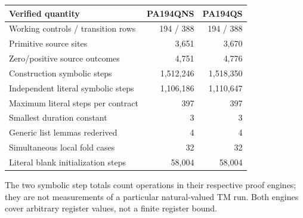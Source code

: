 \begin{center}\small
\begin{tabular}{lrr}
\toprule Verified quantity & PA194QNS & PA194QS\\\midrule
Working controls / transition rows & 194 / 388 & 194 / 388\\
Primitive source sites & 3,651 & 3,670\\
Zero/positive source outcomes & 4,751 & 4,776\\
Construction symbolic steps & 1,512,246 & 1,518,350\\
Independent literal symbolic steps & 1,106,186 & 1,110,647\\
Maximum literal steps per contract & 397 & 397\\
Smallest duration constant & 3 & 3\\
Generic list lemmas rederived & 4 & 4\\
Simultaneous local fold cases & 32 & 32\\
Literal blank initialization steps & 58,004 & 58,004\\
\bottomrule\end{tabular}\end{center}
The two symbolic step totals count operations in their respective proof
engines; they are not measurements of a particular natural-valued TM run.
Both engines cover arbitrary register values, not a finite register bound.
